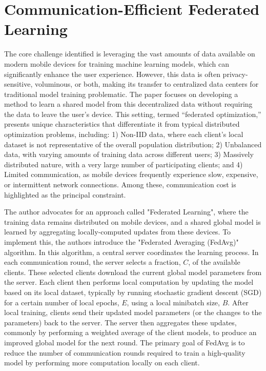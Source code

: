 \section{Communication-Efficient Federated Learning}

The core challenge identified is leveraging the vast amounts of data available on modern mobile devices for training machine learning models, which can significantly enhance the user experience. However, this data is often privacy-sensitive, voluminous, or both, making its transfer to centralized data centers for traditional model training problematic. The paper \cite{mcmahan2017communication}  focuses on developing a method to learn a shared model from this decentralized data without requiring the data to leave the user's device. This setting, termed ``federated optimization,'' presents unique characteristics that differentiate it from typical distributed optimization problems, including: 1) Non-IID data, where each client's local dataset is not representative of the overall population distribution; 2) Unbalanced data, with varying amounts of training data across different users; 3) Massively distributed nature, with a very large number of participating clients; and 4) Limited communication, as mobile devices frequently experience slow, expensive, or intermittent network connections. Among these, communication cost is highlighted as the principal constraint.

The author advocates for an approach called "Federated Learning", where the training data remains distributed on mobile devices, and a shared global model is learned by aggregating locally-computed updates from these devices. To implement this, the authors introduce the "Federated Averaging (FedAvg)" algorithm. In this algorithm, a central server coordinates the learning process. In each communication round, the server selects a fraction, \(C\), of the available clients. These selected clients download the current global model parameters from the server. Each client then performs local computation by updating the model based on its local dataset, typically by running stochastic gradient descent (SGD) for a certain number of local epochs, \(E\), using a local minibatch size, \(B\). After local training, clients send their updated model parameters (or the changes to the parameters) back to the server. The server then aggregates these updates, commonly by performing a weighted average of the client models, to produce an improved global model for the next round. The primary goal of FedAvg is to reduce the number of communication rounds required to train a high-quality model by performing more computation locally on each client.

